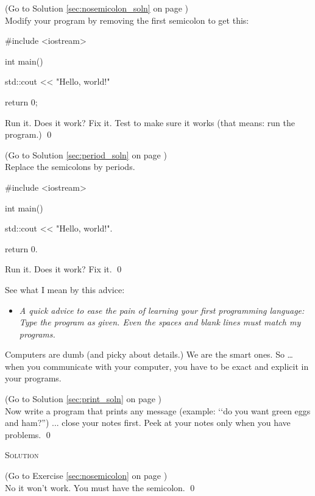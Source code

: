\begin{ex}
\label{sec:nosemicolon}
(Go to Solution \ref{sec:nosemicolon_soln} 
on page \pageref{sec:nosemicolon_soln}) 
\\
Modify your program by removing the first semicolon to get this:
\begin{console}
#include <iostream>

int main()
{
    std::cout << "Hello, world!\n"

    return 0;
}
\end{console}
Run it. 
Does it work? 
Fix it. 
Test to make sure it works (that means: run the program.)
\qed
\end{ex}


\begin{ex}
\label{sec:period}
(Go to Solution \ref{sec:period_soln} 
on page \pageref{sec:period_soln}) 
\\
Replace the semicolons by periods.
\begin{console}
#include <iostream>

int main()
{
    std::cout << "Hello, world!\n".

    return 0.
}
\end{console}
Run it. Does it work? Fix it.
\qed
\end{ex}

See what I mean by this advice:

\begin{itemize}
\item[]
\textit{A quick advice to ease the pain of learning your first programming 
language: Type the program 
 as given. 
Even the spaces and blank lines must match my programs.}
\end{itemize}

Computers are dumb (and picky about details.) 
We are the smart ones. So … when you communicate with your computer, 
you have to be exact and explicit in your programs.


\begin{ex} 
\label{sec:print}
(Go to Solution \ref{sec:print_soln} 
on page \pageref{sec:print_soln}) 
\\
Now write a program that prints any message 
(example: \lq\lq do you want green eggs and ham?'') ... 
close your notes first. Peek at your notes only when you have problems.
\qed
\end{ex}



\newpage\textsc{Solution}

\begin{soln}
\label{sec:nosemicolon_soln} 
(Go to Exercise \ref{sec:nosemicolon} 
on page \pageref{sec:nosemicolon})
\\
No it won't work. 
You must have the semicolon.
\qed
\end{soln}


